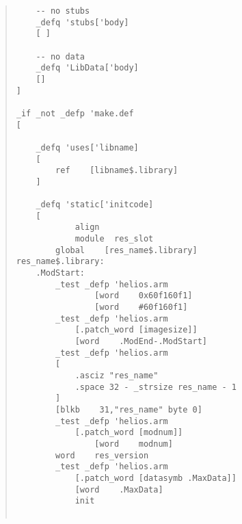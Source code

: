 \begin {quote}
\begin{verbatim}
    -- no stubs
    _defq 'stubs['body]
    [ ]

    -- no data
    _defq 'LibData['body]
    []
]

_if _not _defp 'make.def
[

    _defq 'uses['libname]
    [
        ref    [libname$.library]
    ]

    _defq 'static['initcode]
    [
            align
            module  res_slot
        global    [res_name$.library]
res_name$.library:
    .ModStart:
        _test _defp 'helios.arm
                [word    0x60f160f1]
                [word    #60f160f1]
        _test _defp 'helios.arm
            [.patch_word [imagesize]]
            [word    .ModEnd-.ModStart]
        _test _defp 'helios.arm
        [
            .asciz "res_name"
            .space 32 - _strsize res_name - 1
        ]
        [blkb    31,"res_name" byte 0]
        _test _defp 'helios.arm
            [.patch_word [modnum]]
                [word    modnum]
        word    res_version
        _test _defp 'helios.arm
            [.patch_word [datasymb .MaxData]]
            [word    .MaxData]
            init


\end{verbatim}
\end{quote}
